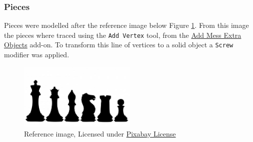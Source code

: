 \documentclass[11pt]{article}
\begin{document}
\subsubsection{Pieces}
\label{sec:orga976a1f}
Pieces were modelled after the reference image below Figure \ref{piece-reference}.
From this image the pieces where traced using the \texttt{Add Vertex} tool, from the
\href{https://docs.blender.org/manual/en/2.92/addons/add\_mesh/mesh\_extra\_objects.html}{Add Mess Extra Objects} add-on. To transform this line of vertices to a solid
object  a \texttt{Screw} modifier was applied.
\begin{figure}[htbp]
\centering
\includegraphics[width=0.5\textwidth]{ref/bee5aa3d08a30da4ca1005cbd0fe10b54a03bb49.jpg}
\caption{\label{piece-reference}Reference image, Licensed under \href{https://pixabay.com/service/license/}{Pixabay License}}
\end{figure}
\end{document}
